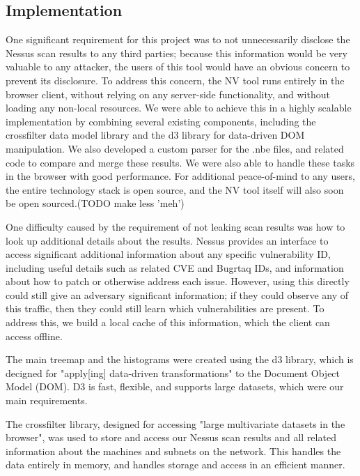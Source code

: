 \documentclass{acm_proc_article-sp}
\begin{document}
\subsection{Implementation}

One significant requirement for this project was to not unnecessarily disclose the Nessus scan results to any third parties; because this information would be very valuable to any attacker, the users of this tool would have an obvious concern to prevent its disclosure.
To address this concern, the NV tool runs entirely in the browser client, without relying on any server-side functionality, and without loading any non-local resources.
We were able to achieve this in a highly scalable implementation by combining several existing components, including the crossfilter data model library and the d3 library for data-driven DOM manipulation.
We also developed a custom parser for the .nbe files, and related code to compare and merge these results.
 We were also able to handle these tasks in the browser with good performance.
For additional peace-of-mind to any users, the entire technology stack is open source, and the NV tool itself will also soon be open sourced.(TODO make less 'meh')

One difficulty caused by the requirement of not leaking scan results was how to look up additional details about the results.
Nessus provides an interface to access significant additional information about any specific vulnerability ID, including useful details such as related CVE and Bugrtaq IDs, and information about how to patch or otherwise address each issue.
However, using this directly could still give an adversary significant information; if they could observe any of this traffic, then they could still learn which vulnerabilities are present.
To address this, we build a local cache of this information, which the client can access offline.

The main treemap and the histograms were created using the d3 library\cite{d3}, which is decigned for "apply[ing] data-driven transformations" to the Document Object Model (DOM).
 D3 is fast, flexible, and supports large datasets, which were our main requirements.

The crossfilter library\cite{crossfilter}, designed for accessing "large multivariate datasets in the browser", was used to store and access our Nessus scan results and all related information about the machines and subnets on the network.
This handles the data entirely in memory, and handles storage and access in an efficient manner.
\end{document}

